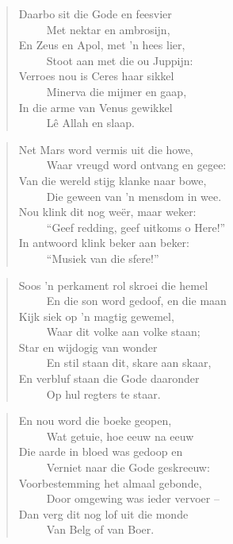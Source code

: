\begin{verse}
Daarbo sit die Gode en feesvier \\ 
\ \ \ \ \ Met nektar en ambrosijn, \\ 
En Zeus en Apol, met ’n hees lier, \\ 
\ \ \ \ \ Stoot aan met die ou Juppijn: \\ 
Verroes nou is Ceres haar sikkel \\ 
\ \ \ \ \ Minerva die mijmer en gaap, \\ 
In die arme van Venus gewikkel \\ 
\ \ \ \ \ Lê Allah en slaap. \\ 
\end{verse}

\begin{verse}
Net Mars word vermis uit die howe, \\ 
\ \ \ \ \ Waar vreugd word ontvang en gegee: \\ 
Van die wereld stijg klanke naar bowe, \\ 
\ \ \ \ \ Die geween van ’n mensdom in wee. \\ 
Nou klink dit nog we\"er, maar weker: \\ 
\ \ \ \ \ ``Geef redding, geef uitkoms o Here!'' \\ 
In antwoord klink beker aan beker: \\ 
\ \ \ \ \ ``Musiek van die sfere!'' \\ 
\end{verse}

\begin{verse}
Soos ’n perkament rol skroei die hemel \\ 
\ \ \ \ \ En die son word gedoof, en die maan \\ 
Kijk siek op ’n magtig gewemel, \\ 
\ \ \ \ \ Waar dit volke aan volke staan; \\ 
Star en wijdogig van wonder \\ 
\ \ \ \ \ En stil staan dit, skare aan skaar, \\ 
En verbluf staan die Gode daaronder \\ 
\ \ \ \ \ Op hul regters te staar. \\ 
\end{verse}

\begin{verse}
En nou word die boeke geopen, \\ 
\ \ \ \ \ Wat getuie, hoe eeuw na eeuw \\ 
Die aarde in bloed was gedoop en \\ 
\ \ \ \ \ Verniet naar die Gode geskreeuw: \\ 
Voorbestemming het almaal gebonde, \\ 
\ \ \ \ \ Door omgewing was ieder vervoer --  \\ 
Dan verg dit nog lof uit die monde \\ 
\ \ \ \ \ Van Belg of van Boer. \\ 
\end{verse}

